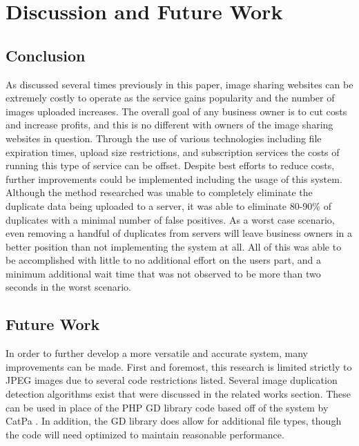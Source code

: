 %
%
%

\chapter{Discussion and Future Work}\label{ch:conclusion}

\section{Conclusion}
As discussed several times previously in this paper, image sharing websites can be extremely costly to operate as the service gains popularity and the number of images uploaded increases. The overall goal of any business owner is to cut costs and increase profits, and this is no different with owners of the image sharing websites in question. Through the use of various technologies including file expiration times, upload size restrictions, and subscription services the costs of running this type of service can be offset. Despite best efforts to reduce costs, further improvements could be implemented including the usage of this system. Although the method researched was unable to completely eliminate the duplicate data being uploaded to a server, it was able to eliminate 80-90\% of duplicates with a minimal number of false positives. As a worst case scenario, even removing a handful of duplicates from servers will leave business owners in a better position than not implementing the system at all. All of this was able to be accomplished with little to no additional effort on the users part, and a minimum additional wait time that was not observed to be more than two seconds in the worst scenario.

\section{Future Work}
In order to further develop a more versatile and accurate system, many improvements can be made. First and foremost, this research is limited strictly to JPEG images due to several code restrictions listed. Several image duplication detection algorithms exist that were discussed in the related works section. These can be used in place of the PHP GD library code based off of the system by CatPa \cite{catpa:gdcode}. In addition, the GD library does allow for additional file types, though the code will need optimized to maintain reasonable performance.

